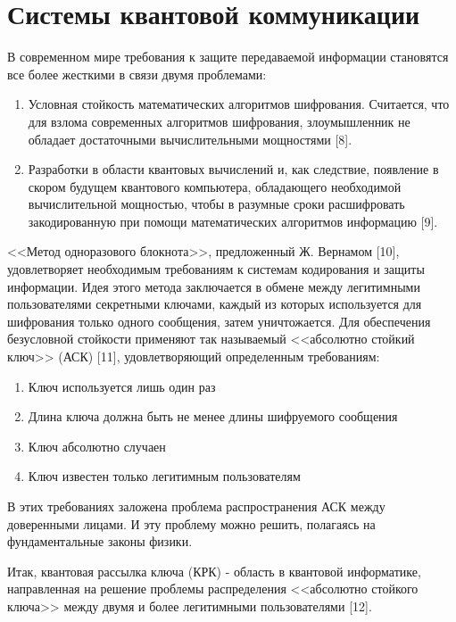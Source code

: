 
\section{Системы квантовой коммуникации} \label{sec:ch1/sec2}

В современном мире требования к защите передаваемой  информации становятся все более жесткими в связи двумя проблемами:
\begin{enumerate}
	\item Условная стойкость математических алгоритмов шифрования.
Считается, что для взлома современных алгоритмов шифрования, злоумышленник не обладает достаточными вычислительными мощностями [8].
	\item Разработки в области квантовых вычислений и, как следствие, появление в скором будущем квантового компьютера, обладающего необходимой вычислительной мощностью, чтобы в разумные сроки расшифровать закодированную при помощи математических алгоритмов информацию [9].
\end{enumerate} 


 <<Метод одноразового блокнота>>, предложенный Ж. Вернамом [10], удовлетворяет необходимым требованиям к системам кодирования и защиты информации. Идея этого метода заключается в обмене между легитимными пользователями секретными ключами, каждый из которых используется для шифрования только одного сообщения, затем уничтожается. Для обеспечения безусловной стойкости применяют так называемый <<абсолютно стойкий ключ>> (АСК) [11], удовлетворяющий определенным требованиям:

\begin{enumerate}
	\item Ключ используется лишь один раз
	\item Длина ключа должна быть не менее длины шифруемого сообщения
	\item Ключ абсолютно случаен
	\item Ключ известен только легитимным пользователям
\end{enumerate}


В этих требованиях заложена проблема распространения АСК между доверенными лицами. И эту проблему можно решить, полагаясь на фундаментальные законы физики.


Итак, квантовая рассылка ключа (КРК) - область в квантовой информатике, направленная на решение проблемы распределения <<абсолютно стойкого ключа>> между двумя и более легитимными пользователями [12].


